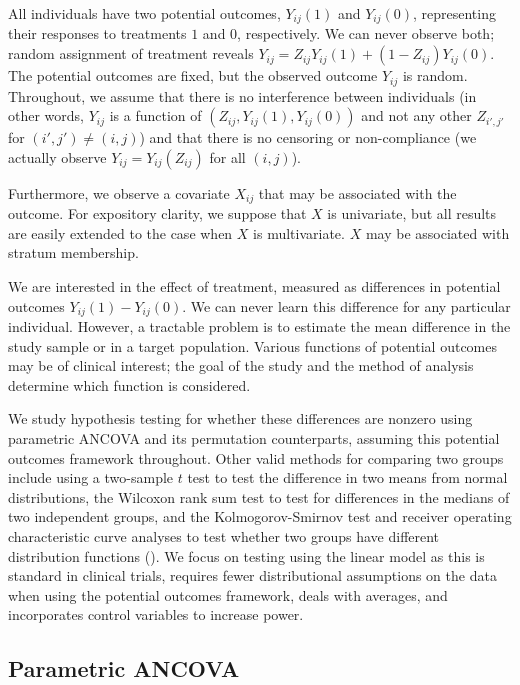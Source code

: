 \documentclass[12pt]{article}
\begin{document}
All individuals have two potential outcomes, $Y_{ij}(1)$ and $Y_{ij}(0)$, representing their responses to treatments $1$ and $0$, respectively.
We can never observe both; random assignment of treatment reveals $Y_{ij} = Z_{ij}Y_{ij}(1) + (1-Z_{ij})Y_{ij}(0)$.
The potential outcomes are fixed, but the observed outcome $Y_{ij}$ is random.
Throughout, we assume that there is no interference between individuals 
(in other words, $Y_{ij}$ is a function of $(Z_{ij}, Y_{ij}(1), Y_{ij}(0))$ and not any other $Z_{i', j'}$ for $(i', j') \neq (i, j)$)
and that there is no censoring or non-compliance
(we actually observe $Y_{ij} = Y_{ij}(Z_{ij})$ for all $(i, j)$).

Furthermore, we observe a covariate $X_{ij}$ that may be associated with the outcome.
For expository clarity, we suppose that $X$ is univariate, but all results are easily extended to the case when $X$ is multivariate.
$X$ may be associated with stratum membership.

We are interested in the effect of treatment, measured as differences in potential outcomes $Y_{ij}(1) - Y_{ij}(0)$.
We can never learn this difference for any particular individual.
However, a tractable problem is to estimate the mean difference in the study sample or in a target population.
Various functions of potential outcomes may be of clinical interest; the goal of the study and the method of analysis determine which function is considered.

We study hypothesis testing for whether these differences are nonzero using parametric ANCOVA and its permutation counterparts, assuming this potential outcomes framework throughout.
Other valid methods for comparing two groups include using a two-sample $t$ test to test the difference in two means from normal distributions,
the Wilcoxon rank sum test to test for differences in the medians of two independent groups, 
and the Kolmogorov-Smirnov test and receiver operating characteristic curve analyses to test whether two groups have different distribution functions (\cite{lehmann_nonparametrics_1975,  vexler_statistical_2016}).
We focus on testing using the linear model as this is standard in clinical trials, 
requires fewer distributional assumptions on the data when using the potential outcomes framework, 
deals with averages,
and incorporates control variables to increase power.


\subsection{Parametric ANCOVA}\label{subsec:ancova}
\end{document}
